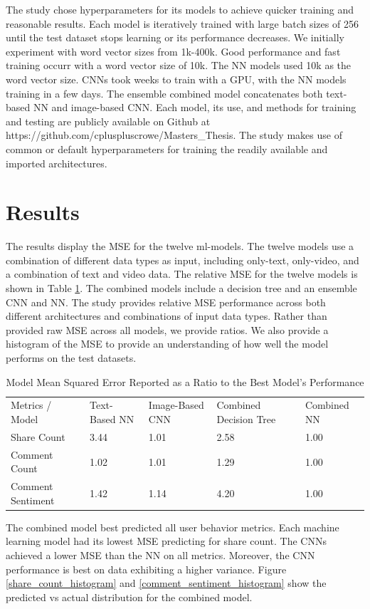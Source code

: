 \documentclass[mksc,blindrev]{informs3} %
\begin{document}
The study chose hyperparameters for its models to achieve quicker training and reasonable results. Each model is iteratively trained with large batch sizes of 256 until the test dataset stops learning or its performance decreases. We initially experiment with word vector sizes from 1k-400k. Good performance and fast training occurr with a word vector size of 10k. The NN models used 10k as the word vector size. CNNs took weeks to train with a GPU, with the NN models training in a few days. The ensemble combined model concatenates both text-based NN and image-based CNN. Each model, its use, and methods for training and testing are publicly available on Github at https://github.com/cpluspluscrowe/Masters\_Thesis. The study makes use of common or default hyperparameters for training the readily available and imported architectures.

\section{Results}

The results display the MSE for the twelve ml-models. The twelve models use a combination of different data types as input, including only-text, only-video, and a combination of text and video data. The relative MSE for the twelve models is shown in Table \ref{mse_ratios}. The combined models include a decision tree and an ensemble CNN and NN. The study provides relative MSE performance across both different architectures and combinations of input data types. Rather than provided raw MSE across all models, we provide ratios.  We also provide a histogram of the MSE to provide an understanding of how well the model performs on the test datasets.

\begin{table}[]
\centering
\begin{tabular}{lllll}
Metrics / Model & Text-Based NN & Image-Based CNN & Combined Decision Tree & Combined NN \\
Share Count       & 3.44 & 1.01 & 2.58 & 1.00 \\
Comment Count     & 1.02 & 1.01 & 1.29 & 1.00 \\
Comment Sentiment & 1.42 & 1.14 & 4.20 & 1.00
\end{tabular}
\caption{\label{mse_ratios}Model Mean Squared Error Reported as a Ratio to the Best Model's Performance}
\end{table}

The combined model best predicted all user behavior metrics. Each machine learning model had its lowest MSE predicting for share count. The CNNs achieved a lower MSE than the NN on all metrics. Moreover, the CNN performance is best on data exhibiting a higher variance. Figure \ref{share_count_histogram} and \ref{comment_sentiment_histogram} show the predicted vs actual distribution for the combined model.
\end{document}
